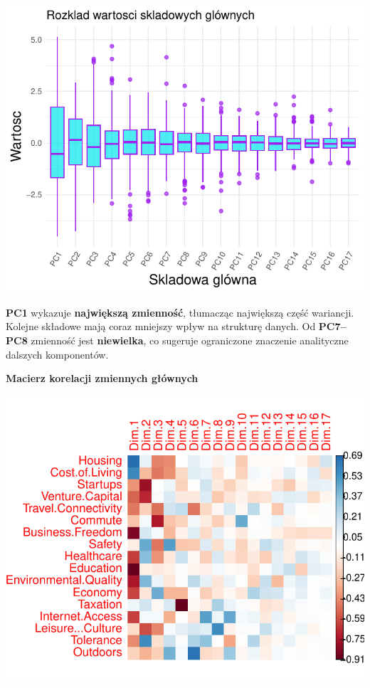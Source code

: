 \documentclass[
  12pt,
]{article}
\begin{document}
\begin{center}\includegraphics{Sprawozdanie2_files/figure-latex/rozklad_wartosci_wykres_boxplot-1} \end{center}

\textbf{PC1} wykazuje \textbf{największą zmienność}, tłumacząc
największą część wariancji. Kolejne składowe mają coraz mniejszy wpływ
na strukturę danych. Od \textbf{PC7--PC8} zmienność jest
\textbf{niewielka}, co sugeruje ograniczone znaczenie analityczne
dalszych komponentów.

\textbf{Macierz korelacji zmiennych głównych}

\begin{center}\includegraphics{Sprawozdanie2_files/figure-latex/wykres_istotnosci_zmiennych_w_danych_ladunkach-1} \end{center}
\end{document}

